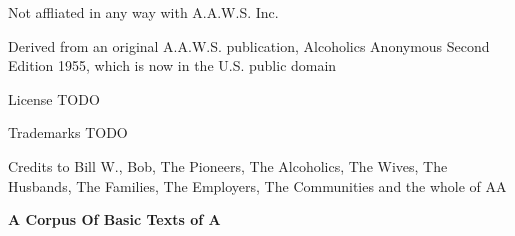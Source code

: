 \begin{legalchapter}


Not affliated in any way with A.A.W.S. Inc.

Derived from an original A.A.W.S. publication, 
Alcoholics Anonymous Second Edition 1955, 
which is now in the U.S. public domain


License TODO


Trademarks TODO


Credits to Bill W., Bob, The Pioneers, The Alcoholics, The Wives, 
The Husbands, The Families, The Employers, The Communities and the whole of AA

\vfill

\vfill
\noindent\small\textbf{%
    A Corpus Of Basic Texts of A
    \\
}

\end{legalchapter}
